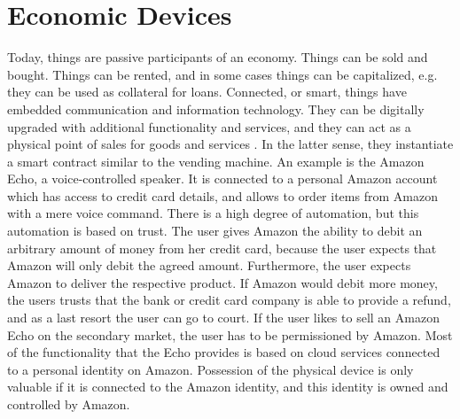 
\section{Economic Devices}

Today, things are passive participants of an economy. Things can be sold and bought. Things can be rented, and in some cases things can be capitalized, e.g. they can be used as collateral for loans. Connected, or smart, things have embedded communication and information technology. They can be digitally upgraded with additional functionality and services, and they can act as a physical point of sales for goods and services \parencite{Fleisch2015}. In the latter sense, they instantiate a smart contract similar to the vending machine. An example is the Amazon Echo, a voice-controlled speaker. It is connected to a personal Amazon account which has access to credit card details, and allows to order items from Amazon with a mere voice command. There is a high degree of automation, but this automation is based on trust. The user gives Amazon the ability to debit an arbitrary amount of money from her credit card, because the user expects that Amazon will only debit the agreed amount. Furthermore, the user expects Amazon to deliver the respective product. If Amazon would debit more money, the users trusts that the bank or credit card company is able to provide a refund, and as a last resort the user can go to court. If the user likes to sell an Amazon Echo on the secondary market, the user has to be permissioned by Amazon. Most of the functionality that the Echo provides is based on cloud services connected to a personal identity on Amazon. Possession of the physical device is only valuable if it is connected to the Amazon identity, and this identity is owned and controlled by Amazon.

